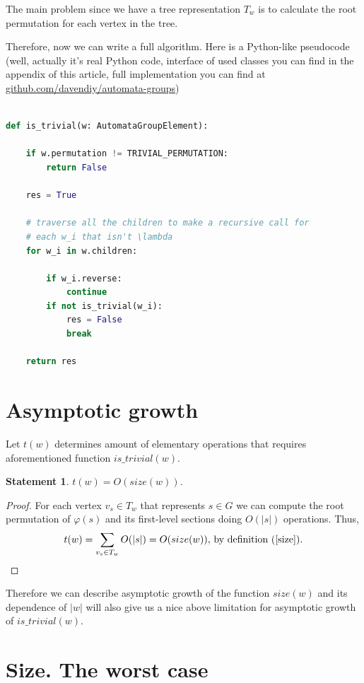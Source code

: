 \documentclass[a4paper,12pt]{amsart}
\newtheorem{statement}{Statement}
\begin{document}
The main problem since we have a tree representation $T_w$ is to calculate the root permutation
for each vertex in the tree.


Therefore, now we can write a full algorithm. Here is a Python-like pseudocode (well, actually
it's real Python code, interface of used classes you can find in the appendix of this article,
full implementation you can find at \href{https://github.com/davendiy/automata-groups}{github.com/davendiy/automata-groups})


\begin{lstlisting}[language=Python]

def is_trivial(w: AutomataGroupElement):

    if w.permutation != TRIVIAL_PERMUTATION:
        return False

    res = True

    # traverse all the children to make a recursive call for
    # each w_i that isn't \lambda
    for w_i in w.children:

        if w_i.reverse:
            continue
        if not is_trivial(w_i):
            res = False
            break

    return res

\end{lstlisting}


\section{Asymptotic growth}

Let $t(w)$ determines amount of elementary operations that requires aforementioned function $is\_trivial(w)$.


\begin{statement}
	$t(w) = O(size(w))$.
\end{statement}

\begin{proof}
	For each vertex $v_s \in T_w$ that represents $s \in G$ we can compute the root permutation of $\varphi(s)$ and its
	first-level sections doing $O(|s|)$ operations. Thus,
	$$
	t(w) = \sum_{v_s \in T_w} O(|s|) = O(size(w)),\, \text{by definition (\ref{size})}.
	$$

\end{proof}

Therefore we can describe asymptotic growth of the function $size(w)$ and its dependence of $|w|$ will
also give us a nice above limitation for asymptotic growth of $is\_trivial(w)$.

\section{Size. The worst case}
\end{document}

